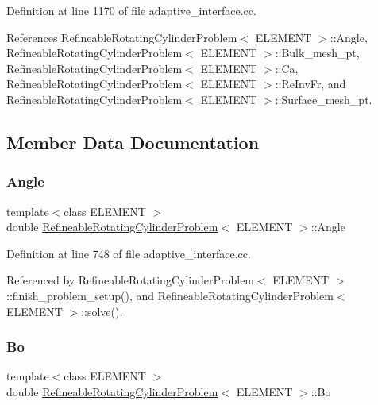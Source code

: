 Definition at line 1170 of file adaptive\+\_\+interface.\+cc.



References Refineable\+Rotating\+Cylinder\+Problem$<$ E\+L\+E\+M\+E\+N\+T $>$\+::\+Angle, Refineable\+Rotating\+Cylinder\+Problem$<$ E\+L\+E\+M\+E\+N\+T $>$\+::\+Bulk\+\_\+mesh\+\_\+pt, Refineable\+Rotating\+Cylinder\+Problem$<$ E\+L\+E\+M\+E\+N\+T $>$\+::\+Ca, Refineable\+Rotating\+Cylinder\+Problem$<$ E\+L\+E\+M\+E\+N\+T $>$\+::\+Re\+Inv\+Fr, and Refineable\+Rotating\+Cylinder\+Problem$<$ E\+L\+E\+M\+E\+N\+T $>$\+::\+Surface\+\_\+mesh\+\_\+pt.



\subsection{Member Data Documentation}
\mbox{\label{classRefineableRotatingCylinderProblem_a54c8bf3a55597f50087c82ed5f955f5b}} 
\subsubsection{\texorpdfstring{Angle}{Angle}}
{\footnotesize\ttfamily template$<$class E\+L\+E\+M\+E\+NT $>$ \\
double \hyperlink{classRefineableRotatingCylinderProblem}{Refineable\+Rotating\+Cylinder\+Problem}$<$ E\+L\+E\+M\+E\+NT $>$\+::Angle}



Definition at line 748 of file adaptive\+\_\+interface.\+cc.



Referenced by Refineable\+Rotating\+Cylinder\+Problem$<$ E\+L\+E\+M\+E\+N\+T $>$\+::finish\+\_\+problem\+\_\+setup(), and Refineable\+Rotating\+Cylinder\+Problem$<$ E\+L\+E\+M\+E\+N\+T $>$\+::solve().

\mbox{\label{classRefineableRotatingCylinderProblem_a253a0d7954a3527bf1410f01080e5c70}} 
\subsubsection{\texorpdfstring{Bo}{Bo}}
{\footnotesize\ttfamily template$<$class E\+L\+E\+M\+E\+NT $>$ \\
double \hyperlink{classRefineableRotatingCylinderProblem}{Refineable\+Rotating\+Cylinder\+Problem}$<$ E\+L\+E\+M\+E\+NT $>$\+::Bo}



